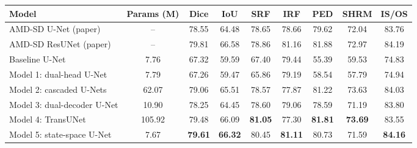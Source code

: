 \begin{tabular}{lcccccccc}
\toprule
\textbf{Model} & \textbf{Params (M)} & \textbf{Dice} & \textbf{IoU} & \textbf{SRF} & \textbf{IRF} & \textbf{PED} & \textbf{SHRM} & \textbf{IS/OS} \\
\midrule
AMD-SD U-Net (paper) & -- & 78.55 & 64.48 & 78.65 & 78.66 & 79.62 & 72.04 & 83.76 \\
AMD-SD ResUNet (paper) & -- & 79.81 & 66.58 & 78.86 & 81.16 & 81.88 & 72.97 & 84.19 \\
\midrule
Baseline U-Net & 7.76 & 67.32 & 59.59 & 67.40 & 79.44 & 55.39 & 59.53 & 74.83 \\
Model 1: dual-head U-Net & 7.79 & 67.26 & 59.47 & 65.86 & 79.19 & 58.54 & 57.79 & 74.94 \\
Model 2: cascaded U-Nets & 62.07 & 79.06 & 65.51 & 78.57 & 77.87 & 81.22 & 73.63 & 84.03 \\
Model 3: dual-decoder U-Net & 10.90 & 78.25 & 64.45 & 78.60 & 79.06 & 78.59 & 71.19 & 83.80 \\
Model 4: TransUNet & 105.92 & 79.48 & 66.09 & \textbf{81.05} & 77.30 & \textbf{81.81} & \textbf{73.69} & 83.55 \\
Model 5: state-space U-Net & 7.67 & \textbf{79.61} & \textbf{66.32} & 80.45 & \textbf{81.11} & 80.73 & 71.59 & \textbf{84.16} \\
\bottomrule
\end{tabular}
